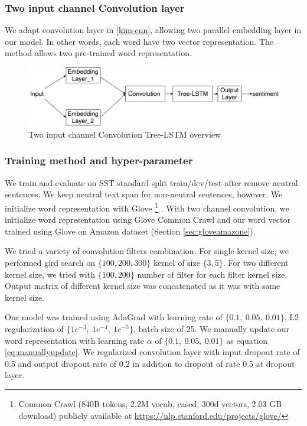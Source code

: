 \subsubsection{Two input channel Convolution layer} \label{sec:conv2c}
We adapt convolution layer in \ref{kim-cnn}, allowing two parallel embedding layer in our model. In other words, each word have two vector representation. The method allows two pre-trained word representation. 

\begin{figure}[H]
	\centering
	\includegraphics[width=0.8\linewidth]{figure/multichannelcnnlstm}
	\caption[Convolution Tree-LSTM overview]{Two input channel Convolution Tree-LSTM overview}
	\label{fig:multichannelcnnlstm}
\end{figure}

\subsubsection{Training method and hyper-parameter}
We train and evaluate on SST standard split train/dev/test after remove neutral sentences. We keep neutral text span for non-neutral sentences, however. We initialize word representation with Glove \footnote{\label{glovecommoncrawl}Common Crawl (840B tokens, 2.2M vocab, cased, 300d vectors, 2.03 GB download) publicly available at \url{https://nlp.stanford.edu/projects/glove/}} \cite{glove}. With two channel convolution, we initialize word representation using Glove Common Crawl and our word vector trained using Glove on Amazon dataset (Section \ref{sec:gloveamazone}). 

We tried a variety of convolution filters combination. For single kernel size, we performed gird search on $\{100, 200, 300\}$ kernel of size $\{3, 5\}$. For two different kernel size, we tried with $\{100, 200\}$ number of filter for each filter kernel size. Output matrix of different kernel size was concatenated as it was with same kernel size. 

Our model was trained using AdaGrad \cite{duchi2011adaptive} with learning rate of $\{0.1,~ 0.05,~ 0.01\}$, L2 regularization of $\{1e^{-3},~ 1e^{-4}, ~ 1e^{-5} \}$, batch size of 25. We manually update our word representation with learning rate $\alpha$ of $\{0.1,~0.05, ~0.01\}$ as equation \ref{eq:manuallyupdate}. We regularized convolution layer with input dropout rate of 0.5 and output dropout rate of 0.2 in addition to dropout of rate 0.5 at dropout layer. 

